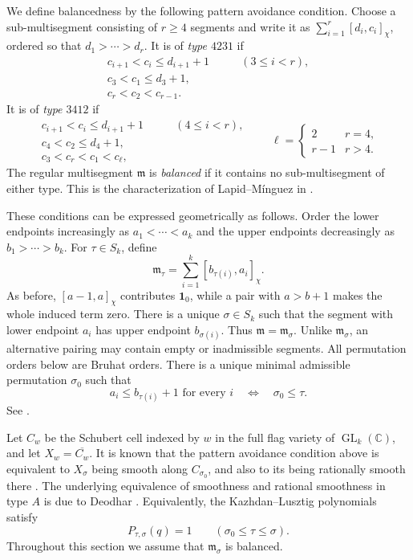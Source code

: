 \documentclass[10pt,a4paper]{article}
\theoremstyle{definition}
\theoremstyle{remark}
\numberwithin{equation}{section}
\newcommand{\CC}{\mathbb{C}}
\newcommand{\fm}{\mathfrak{m}}
\newcommand{\one}{\mathbf{1}}
\DeclareMathOperator{\GL}{GL}
\begin{document}
We define balancedness by the following pattern avoidance condition.
Choose a sub-multisegment consisting of $r\geq4$ segments and write it
as $\sum_{i=1}^r[d_i,c_i]_\chi$, ordered so that
$d_1>\cdots>d_r$. It is of \emph{type $4231$} if
\[
 \begin{aligned}
  c_{i+1}<c_i\leq d_{i+1}+1&\qquad(3\leq i<r),\\
  c_3<c_1\leq d_3+1,&\\
  c_r<c_2<c_{r-1}.&
 \end{aligned}
\]
It is of \emph{type $3412$} if
\[
 \begin{aligned}
  c_{i+1}<c_i\leq d_{i+1}+1&\qquad(4\leq i<r),\\
  c_4<c_2\leq d_4+1,&\\
  c_3<c_r<c_1<c_\ell,&
 \end{aligned}
 \qquad
 \ell=\begin{cases}2&r=4,\\r-1&r>4.\end{cases}
\]
The regular multisegment $\fm$ is \emph{balanced} if it contains
no sub-multisegment of either type. This is the characterization of
Lapid--M\'inguez in \cite[Definition~6.10 and Proposition~6.13]{RegularLM2018}.

These conditions can be expressed geometrically as follows. Order the lower endpoints
increasingly as $a_1<\cdots<a_k$ and the upper endpoints
decreasingly as $b_1>\cdots>b_k$. For $\tau\in S_k$, define
\begin{equation}\label{gl:regular:data}
	\fm_\tau=\sum_{i=1}^k[b_{\tau(i)},a_i]_\chi.
\end{equation}
As before, $[a-1,a]_\chi$ contributes
$\one_0$, while a pair with $a>b+1$ makes the whole induced term zero. There is a unique
$\sigma\in S_k$ such that the segment with lower endpoint $a_i$
has upper endpoint $b_{\sigma(i)}$. Thus $\fm=\fm_\sigma$. Unlike $\fm_\sigma$,
an alternative pairing may contain empty or inadmissible segments.
All permutation orders below are Bruhat orders.
There is a unique minimal admissible permutation $\sigma_0$ such that
\begin{equation}\label{gl:regular:admissible}
 a_i\leq b_{\tau(i)}+1\text{ for every }i
 \quad\Longleftrightarrow\quad \sigma_0\leq\tau.
\end{equation}
See \cite[\S6.1, equation~(15)]{RegularLM2018}.

Let $C_w$ be the Schubert cell indexed by $w$ in the full flag variety
of $\GL_k(\CC)$, and let $X_w=\overline{C_w}$.
It is known that the pattern avoidance condition above
is equivalent to $X_\sigma$ being smooth along $C_{\sigma_0}$,
and also to its being rationally smooth there
\cite[Corollary~6.7 and Theorem~1.2(4), (6)]{RegularLM2018}.
The underlying equivalence of smoothness and rational smoothness in
type $A$ is due to Deodhar \cite{Deodhar1985}.
Equivalently, the Kazhdan--Lusztig polynomials satisfy
\begin{equation}\label{gl:regular:smooth}
 P_{\tau,\sigma}(q)=1\qquad(\sigma_0\leq\tau\leq\sigma).
\end{equation}
Throughout this section we assume that $\fm_\sigma$ is balanced.
\end{document}
